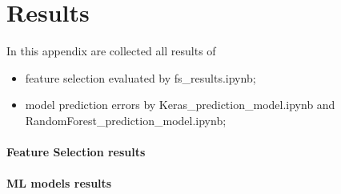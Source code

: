 \chapter{Results}
In this appendix are collected all results of
\begin{itemize}
    \item feature selection evaluated by fs\_results.ipynb;
    \item model prediction errors by Keras\_prediction\_model.ipynb and RandomForest\_prediction\_model.ipynb;
\end{itemize}
\subsubsection{Feature Selection results}
\subsubsection{ML models results}
